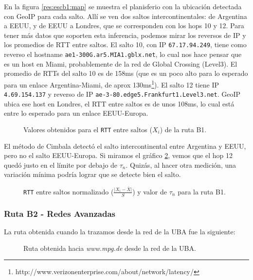En la figura \ref{res:escb1:map} se muestra el planisferio con la ubicación detectada con GeoIP para cada salto. Allí se ven dos saltos intercontinentales: de Argentina a EEUU, y de EEUU a Londres, que se corresponden con los hops 10 y 12. Para tener más datos que soporten esta inferencia, podemos mirar los reversos de IP y los promedios de RTT entre saltos. El salto 10, con IP \texttt{67.17.94.249}, tiene como reverso el hostname \texttt{ae1-300G.ar5.MIA1.gblx.net}, lo cual nos hace pensar que es un host en Miami, probablemente de la red de Global Crossing (Level3). El promedio de RTTs del salto 10 es de 158ms (que es un poco alto para lo esperado para un enlace Argentina-Miami, de aprox 130ms\footnote{http://www.verizonenterprise.com/about/network/latency/}). El salto 12 tiene IP \texttt{4.69.154.137} y reverso de IP \texttt{ae-3-80.edge5.Frankfurt1.Level3.net}. GeoIP ubica ese host en Londres, el RTT entre saltos es de unos 108ms, lo cual está entre lo esperado para un enlace EEUU-Europa.

\begin{figure}[H]
    \caption{Valores obtenidos para el \texttt{RTT} entre saltos ($X_i$) de la ruta B1.}
    \label{res:escb1:rtt}
\end{figure}

El método de Cimbala detectó el salto intercontinental entre Argentina y EEUU, pero no el salto EEUU-Europa. Si miramos el gráfico \ref{res:escb1:rttnorm}, vemos que el hop 12 quedó justo en el límite por debajo de $\tau_n$. Quizás, al hacer otra medición, una variación mínima podría lograr que se detecte bien el salto.

\begin{figure}[H]
    \caption{\texttt{RTT} entre saltos normalizado ($\frac{\vert X_i-\bar{X}\vert}{S}$)
    y valor de $\tau_n$ para la ruta B1.}
    \label{res:escb1:rttnorm}
\end{figure}

\subsubsection{Ruta B2 - Redes Avanzadas}

La ruta obtenida cuando la trazamos desde la red de la UBA fue la siguiente:

\begin{figure}[H]
    \caption{Ruta obtenida hacia \emph{www.mpg.de} desde la red de la UBA.}
    \label{res:escB2:table}
\end{figure}

